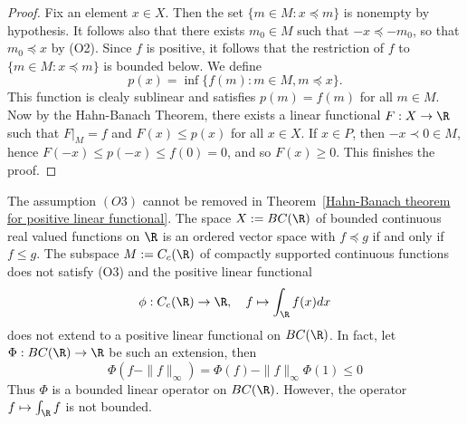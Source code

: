 \begin{proof}
Fix an element $x\in X$. Then the set $\{m\in M:x\preceq m\}$ is nonempty by hypothesis. It follows also that there exists $m_0\in M$ such that $-x\preceq -m_0$, so that $m_0\preceq x$ by (O2). Since $f$ is positive, it follows that the restriction of $f$ to $\{m\in M:x\preceq m\}$ is bounded below. We define
\[p(x)=\inf\{f(m):m\in M,m\preceq x\}.\]
This function is clealy sublinear and satisfies $p(m)=f(m)$ for all $m\in M$. Now by the Hahn-Banach Theorem, there exists a linear functional $F:X\to\R$ such that $F|_{M}=f$ and $F(x)\leq p(x)$ for all $x\in X$. If $x\in P$, then $-x\prec 0\in M$, hence $F(-x)\leq p(-x)\leq f(0)=0$, and so $F(x)\geq 0$. This finishes the proof.
\end{proof}
\begin{example}
The assumption $(O3)$ cannot be removed in Theorem~\ref{Hahn-Banach theorem for positive linear functional}. The space $X:=BC(\R)$ of bounded continuous real valued functions on $\R$ is an ordered vector space with $f\preceq g$ if and only if $f\leq g$. The subspace $M:=C_c(\R)$ of compactly supported continuous functions does not satisfy (O3) and the positive linear functional
\[\phi:C_c(\R)\to\R,\quad f\mapsto\int_{\R}f(x)dx\]
does not extend to a positive linear functional on $BC(\R)$. In fact, let $\Phi:BC(\R)\to\R$ be such an extension, then
\[\Phi(f-\|f\|_\infty)=\Phi(f)-\|f\|_\infty\Phi(1)\leq 0\]
Thus $\Phi$ is a bounded linear operator on $BC(\R)$. However, the operator $f\mapsto\int_{\R}f$ is not bounded.
\end{example}
